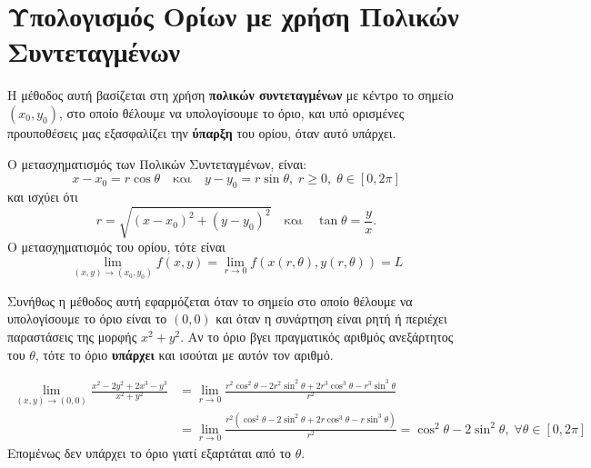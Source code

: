 \documentclass[a4paper,11pt]{report}
\begin{document}
  \section{Υπολογισμός Ορίων με χρήση Πολικών Συντεταγμένων}

  Η μέθοδος αυτή βασίζεται στη χρήση \textbf{πολικών συντεταγμένων} με κέντρο το σημείο 
  $ (x_{0}, y_{0}) $, στο οποίο θέλουμε να υπολογίσουμε το όριο, και υπό ορισμένες
  προυποθέσεις μας εξασφαλίζει 
  την \textbf{ύπαρξη} του ορίου, όταν αυτό υπάρχει.

  \begin{rem}
  \item {}
    \begin{myitemize}
      \item Ο μετασχηματισμός των Πολικών Συντεταγμένων, είναι:
        \[
          x - x_{0} = r \cos{\theta} \quad \text{και} \quad y - y_{0} = 
          r \sin{\theta}, \; r \geq 0, \; \theta \in [0, 2 \pi]
        \] 
        και ισχύει ότι 
        \[
          r = \sqrt{(x- x_{0})^{2}+(y- y_{0})^{2}} \quad \text{και} \quad \tan\theta = 
          \frac{y}{x}.
        \] 
        Ο μετασχηματισμός του ορίου, τότε είναι 
        \[
          \lim\limits_{(x,y)\to (x_{0}, y_{0})} f(x,y) = 
          \lim_{r \to 0} f(x(r, \theta ), y(r, \theta)) = L
        \] 

      \item Συνήθως η μέθοδος αυτή εφαρμόζεται όταν το σημείο στο οποίο θέλουμε να 
        υπολογίσουμε το όριο είναι το $ (0,0) $ και όταν η συνάρτηση είναι ρητή ή 
        περιέχει παραστάσεις της μορφής $ x^{2}+y^{2} $. Αν το όριο βγει 
        πραγματικός αριθμός ανεξάρτητος του $\theta$, τότε το όριο \textbf{υπάρχει} και 
        ισούται με αυτόν τον αριθμό.
    \end{myitemize}
  \end{rem}

  \begin{example}
    \begin{align*} \lim\limits_{(x,y)\to (0, 0)} 
      \frac{x^{2}-2y^{2}+2x^{3}-y^{3}}{x^{2}+y^{2}} 
               &= \lim_{r \to 0} \frac{r^{2} \cos^{2}{\theta} - 2r^{2} \sin^{2}{\theta 
               +2r^{3} \cos^{3}{\theta - r^{3} \sin^{3}{\theta}}}}{r^{2}} \\ 
               &= \lim_{r \to 0} \frac{r^{2}(\cos^{2}{\theta} - 2 \sin^{2}{\theta} +2r 
               \cos^{3}{\theta} - r \sin^{3}{\theta})}{r^{2}} = 
               \cos^{2}{\theta} - 2 \sin^{2}{\theta}, \; \forall \theta \in [0, 2 \pi]
               \!\!
    \end{align*}
    Επομένως δεν υπάρχει το όριο γιατί εξαρτάται από το $\theta$.
  \end{example}
\end{document}
